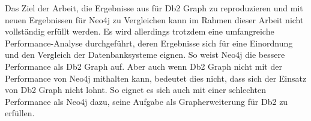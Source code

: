Das Ziel der Arbeit, die Ergebnisse aus \cite{sigmod_tian} für Db2 Graph zu reproduzieren und mit neuen Ergebnissen für Neo4j zu Vergleichen kann im Rahmen dieser Arbeit nicht vollständig erfüllt werden. Es wird allerdings trotzdem eine umfangreiche Performance-Analyse durchgeführt, deren Ergebnisse sich für eine Einordnung und den Vergleich der Datenbanksysteme eignen. So weist Neo4j die bessere Performance als Db2 Graph auf. Aber auch wenn Db2 Graph nicht mit der Performance von Neo4j mithalten kann, bedeutet dies nicht, dass sich der Einsatz von Db2 Graph nicht lohnt. So eignet es sich auch mit einer schlechten Performance als Neo4j dazu, seine Aufgabe als Grapherweiterung für Db2 zu erfüllen.

\listoftodos